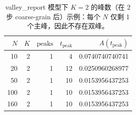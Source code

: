 \begin{table}[!htbp]
\centering
\begin{tabular}{rrrrr}
\toprule
$N$ & $K$ & $\mathrm{peaks}$ & $t_{\mathrm{peak}}$ & $A(t_{\mathrm{peak}})$\\
\midrule
10 & 2 & 1 & 4 & 0.0740740740741\\
20 & 2 & 1 & 12 & 0.0250960268977\\
50 & 2 & 1 & 10 & 0.0153956437253\\
100 & 2 & 1 & 10 & 0.0153956437253\\
160 & 2 & 1 & 10 & 0.0153956437253\\
\bottomrule
\end{tabular}
\caption{valley\_report 模型下 $K=2$ 的峰数（在 2 步 coarse-grain 后）示例：每个 $N$ 仅剩 1 个主峰，因此不存在双峰。}
\label{tab:valley-report-k2-cn}
\end{table}
